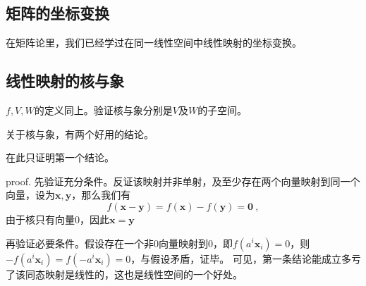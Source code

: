 \subsection{矩阵的坐标变换}
在矩阵论里，我们已经学过在同一线性空间中线性映射的坐标变换。
\subsection{线性映射的核与象}

\begin{exercise}{}
$f,V,W$的定义同上。验证核与象分别是$V$及$W$的子空间。
\end{exercise}
关于核与象，有两个好用的结论。
在此只证明第一个结论。

proof.
先验证充分条件。反证该映射并非单射，及至少存在两个向量映射到同一个向量，设为$\boldsymbol{x,y}$，那么我们有
\begin{equation}
f(\boldsymbol{x}-\boldsymbol{y})=f(\boldsymbol x)-f(\boldsymbol y)=\boldsymbol 0~,
\end{equation}
由于核只有向量$0$，因此$\boldsymbol {x}=\boldsymbol{y}$

再验证必要条件。假设存在一个非$0$向量映射到$0$，即$f(a^i\boldsymbol x_i)=0$，则$-f(a^i\boldsymbol x_i)=f(-a^i\boldsymbol x_i)=0$，与假设矛盾，证毕。
可见，第一条结论能成立多亏了该同态映射是线性的，这也是线性空间的一个好处。

